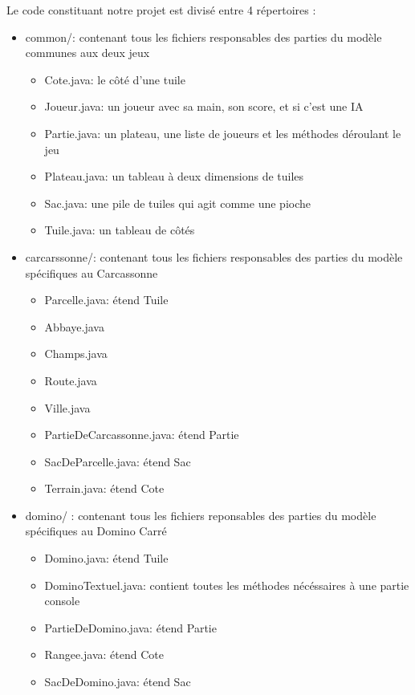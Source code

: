 \documentclass{article}
\begin{document}
Le code constituant notre projet est divisé entre 4 répertoires :
\begin{itemize}
    \item common/: contenant tous les fichiers responsables des parties du modèle communes aux deux jeux
    \begin{itemize}
        \item Cote.java: le côté d'une tuile
        \item Joueur.java: un joueur avec sa main, son score, et si c'est une IA
        \item Partie.java: un plateau, une liste de joueurs et les méthodes déroulant le jeu
        \item Plateau.java: un tableau à deux dimensions de tuiles
        \item Sac.java: une pile de tuiles qui agit comme une pioche
        \item Tuile.java: un tableau de côtés
    \end{itemize}    
    \item carcarssonne/: contenant tous les fichiers responsables des parties du modèle spécifiques au Carcassonne
    \begin{itemize}        
        \item Parcelle.java: étend Tuile
        \item Abbaye.java
        \item Champs.java
        \item Route.java
        \item Ville.java
        \item PartieDeCarcassonne.java: étend Partie
        \item SacDeParcelle.java: étend Sac
        \item Terrain.java: étend Cote
    \end{itemize}
    \item domino/ : contenant tous les fichiers reponsables des parties du modèle spécifiques au Domino Carré
    \begin{itemize}
        \item Domino.java: étend Tuile
        \item DominoTextuel.java: contient toutes les méthodes nécéssaires à une partie console
        \item PartieDeDomino.java: étend Partie
        \item Rangee.java: étend Cote
        \item SacDeDomino.java: étend Sac
    \end{itemize}

\end{itemize}
\end{document}
